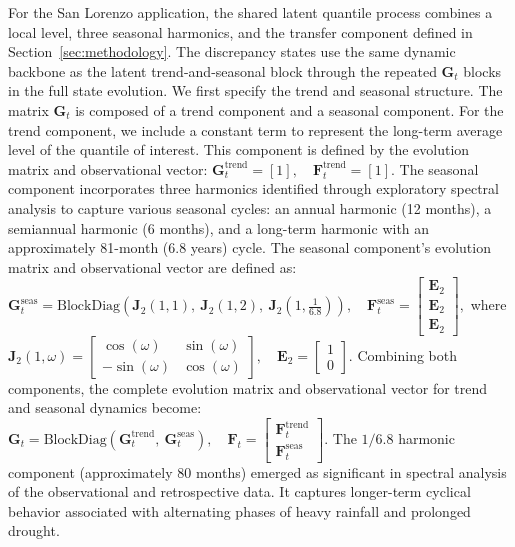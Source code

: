 \documentclass[APA,STIX1COL]{WileyNJD-v2}
\begin{document}
For the San Lorenzo application, the shared latent quantile process combines a local level, three seasonal harmonics, and the transfer component defined in Section~\ref{sec:methodology}. The discrepancy states use the same dynamic backbone as the latent trend-and-seasonal block through the repeated \(\mathbf{G}_t\) blocks in the full state evolution. We first specify the trend and seasonal structure. The matrix \(\mathbf{G}_t\) is composed of a trend component and a seasonal component. For the trend component, we include a constant term to represent the long-term average level of the quantile of interest. This component is defined by the evolution matrix and observational vector:
\( \mathbf{G}^{\text{trend}}_t = [1], \quad
\mathbf{F}^{\text{trend}}_t = [1]. \) The seasonal component incorporates three harmonics identified through exploratory spectral analysis to capture various seasonal cycles: an annual harmonic (12 months), a semiannual harmonic (6 months), and a long-term harmonic with an approximately 81-month (6.8 years) cycle. The seasonal component's evolution matrix and observational vector are defined as:
\( \mathbf{G}^{\text{seas}}_t = \text{BlockDiag}\left(\textbf{J}_2(1,1),\ \textbf{J}_2(1,2),\ \textbf{J}_2\left(1,\frac{1}{6.8}\right)\right),\quad
\mathbf{F}^{\text{seas}}_t  = 
\begin{bmatrix}
\mathbf{E}_2 \\[5pt]
\mathbf{E}_2 \\[5pt]
\mathbf{E}_2
\end{bmatrix}, \)
where
\( \textbf{J}_2(1,\omega) = 
\begin{bmatrix}
\cos(\omega) & \sin(\omega) \\[5pt]
-\sin(\omega) & \cos(\omega)
\end{bmatrix},\quad
\mathbf{E}_2 = 
\begin{bmatrix}
1 \\[5pt]
0
\end{bmatrix}. \)
Combining both components, the complete evolution matrix and observational vector for trend and seasonal dynamics become:
\(
\mathbf{G}_t = \text{BlockDiag}\left(\mathbf{G}^{\text{trend}}_t,\ \mathbf{G}^{\text{seas}}_t\right),\quad
\mathbf{F}_t = 
\begin{bmatrix}
\mathbf{F}^{\text{trend}}_t \\[5pt]
\mathbf{F}^{\text{seas}}_t
\end{bmatrix}.
\) The \(1/6.8\) harmonic component (approximately 80 months) emerged as significant in spectral analysis of the observational and retrospective data. It captures longer-term cyclical behavior associated with alternating phases of heavy rainfall and prolonged drought.
\end{document}
